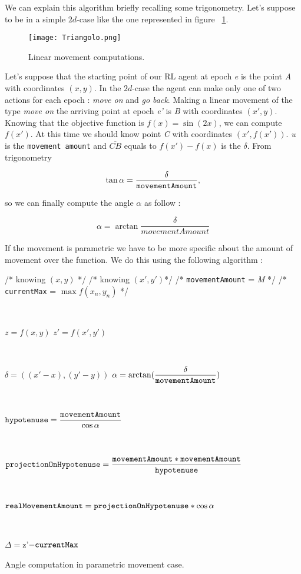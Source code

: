 We can explain this algorithm briefly recalling some trigonometry. Let's suppose to be in a simple $2d$-case like the one represented in figure ~\ref{fig:LMComputations}.

\begin{figure} [h!]
	\centering
	\texttt{[image: Triangolo.png]}
	\caption{Linear movement computations.}
	\label{fig:LMComputations}
\end{figure}

Let's suppose that the starting point of our RL agent at epoch \textit{e} is the point \textit{A} with coordinates $(x, y)$. In the $2d$-case the agent can make only one of two actions for each epoch : \textit{move on} and \textit{go back}. Making a linear movement of the type \textit{move on} the arriving point at epoch \textit{e'} is \textit{B} with coordinates $(x', y)$. Knowing that the objective function is $f(x) = \sin(2x)$, we can compute $f(x')$. At this time we should know point \textit{C} with coordinates $(x', f(x'))$. \textit{u} is the {\tt movement amount} and $\overline{CB}$ equals to $f(x') - f(x)$ is the $\delta$. From trigonometry 

\begin{equation}
	\tan \alpha = \dfrac{\delta}{\tt movementAmount},
\end{equation}

so we can finally compute the angle $\alpha$ as follow :

\begin{equation}
	\alpha = \arctan \dfrac{\delta}{movementAmount}
\end{equation}

If the movement is parametric we have to be more specific about the amount of movement over the function. We do this using the following algorithm :

\begin{algorithm}
	/* knowing $(x, y)$ */ \;
	/* knowing $(x', y')$*/ \;
	/* {\tt movementAmount} = \textit{M} */ \;
	/* {\tt currentMax} = $\max f(x_n, y_n)$ */ \;
	
	
	\
	
	$z = f(x, y)$ \;
	$z' = f(x', y')$\;
	
	\
	
	$\delta = ((x'-x),  (y'-y))$ \;
	$\alpha = \arctan(\dfrac{\delta}{\tt movementAmount})$ \;
	
	\
	
	${\tt hypotenuse} = \dfrac{{\tt movementAmount}}{\cos \alpha}$ \;
	
	\
	
	${\tt projectionOnHypotenuse} = \dfrac{{\tt movementAmount} * {\tt movementAmount}}{{\tt hypotenuse}}$ \;
	
	\
	
	${\tt realMovementAmount} = {\tt projectionOnHypotenuse} * \cos \alpha$ \;
	 
	 \
	
	$\Delta = $z'$ - {\tt currentMax} $\;
	
	\caption{Angle computation in parametric movement case.} 
	\label{PMAlgo}
	
\end{algorithm}

